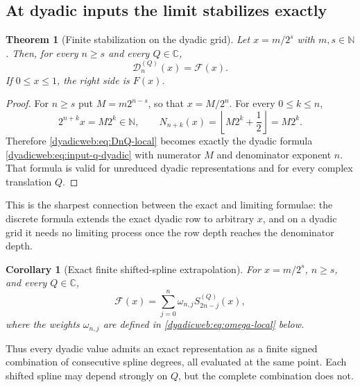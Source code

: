 \documentclass[11pt,oneside]{article}
\newtheorem{theorem}{Theorem}[section]
\newtheorem{corollary}[corollary]{Corollary}
\theoremstyle{definition}
\theoremstyle{remark}
\newcommand{\C}{\mathbb C}
\newcommand{\N}{\mathbb N}
\begin{document}
\subsection{At dyadic inputs the limit stabilizes exactly}

\begin{theorem}[Finite stabilization on the dyadic grid]
\label{dyadicweb:thm:dyadic-stabilization}
Let $x=m/2^s$ with $m,s\in\N$.  Then, for every $n\ge s$ and every $Q\in\C$,
\begin{equation}
 \boxed{\mathcal D_n^{(Q)}(x)=\mathcal F(x).}              \label{dyadicweb:eq:dyadic-stabilization}
\end{equation}
If $0\le x\le1$, the right side is $F(x)$.
\end{theorem}

\begin{proof}
For $n\ge s$ put $M=m2^{n-s}$, so that $x=M/2^n$.  For every $0\le k\le n$,
\[
 2^{n+k}x=M2^k\in\N,
 \qquad
 N_{n+k}(x)=\left\lfloor M2^k+\frac12\right\rfloor=M2^k.
\]
Therefore \eqref{dyadicweb:eq:DnQ-local} becomes exactly the dyadic formula
\eqref{dyadicweb:eq:input-q-dyadic} with numerator $M$ and denominator exponent $n$.  That formula is
valid for unreduced dyadic representations and for every complex translation $Q$.
\end{proof}

This is the sharpest connection between the exact and limiting formulae: the discrete formula
extends the exact dyadic row to arbitrary $x$, and on a dyadic grid it needs no limiting
process once the row depth reaches the denominator depth.

\begin{corollary}[Exact finite shifted-spline extrapolation]
\label{dyadicweb:cor:exact-shifted-extrapolation}
For $x=m/2^s$, $n\ge s$, and every $Q\in\C$,
\begin{equation}
 \mathcal F(x)=\sum_{j=0}^{n}\omega_{n,j}
 S_{2n-j}^{(Q)}(x),                                       \label{dyadicweb:eq:exact-shifted-extrapolation}
\end{equation}
where the weights $\omega_{n,j}$ are defined in
\eqref{dyadicweb:eq:omega-local} below.
\end{corollary}

Thus every dyadic value admits an exact representation as a finite signed combination of
consecutive spline degrees, all evaluated at the same point.  Each shifted spline may depend
strongly on $Q$, but the complete combination does not.
\end{document}
